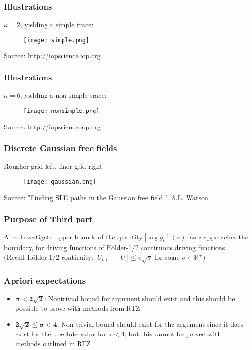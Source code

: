 \documentclass[10pt, compress]{beamer}
\begin{document}
\begin{frame}[fragile]
  \frametitle{Illustrations}
$\kappa=2$, yielding a simple trace:
\begin{figure}
  \centering
 \texttt{[image: simple.png]}
\end{figure}
\small
Source: http://iopscience.iop.org
\normalsize
\end{frame}

\begin{frame}[fragile]
  \frametitle{Illustrations}
$\kappa=6$, yielding a non-simple trace:
\begin{figure}
  \centering
 \texttt{[image: nonsimple.png]}
\end{figure}
\small
Source: http://iopscience.iop.org
\normalsize
\end{frame}

\begin{frame}[fragile]
  \frametitle{Discrete Gaussian free fields}
Rougher grid left, finer grid right
\begin{figure}
  \centering
 \texttt{[image: gaussian.png]}
\end{figure}
\small
Source: "Finding SLE paths in the Gaussian free field ", S.L. Watson
\normalsize
\end{frame}

\begin{frame}[fragile]
  \frametitle{Purpose of Third part}
Aim: Investigate upper bounds of the quantity $|\arg g^{-1 \prime}_{t}(z)|$ as $z$ approaches the boundary, for driving functions of H\"older-1/2 continuous driving functions\\

(Recall H\"older-1/2 continuity: $|U_{t+s}-U_{t}| \leq \sigma \sqrt{s}$ for some $\sigma \in \mathbb{R}^{+}$)


\end{frame}

\begin{frame}[fragile]
  \frametitle{Apriori expectations}
\begin{itemize}
\item $\boldsymbol{\sigma<2\sqrt{2}}$: Nontrivial bound for argument should exist and this should be possible to prove with methods from RTZ\\

\item $\boldsymbol{2\sqrt{2} \leq \sigma < 4}$. Non-trivial bound should exist for the argument since it does exist for the absolute value for $\sigma <4$; but this cannot be proved with methods outlined in RTZ
\end{itemize}
\end{frame}
\end{document}
